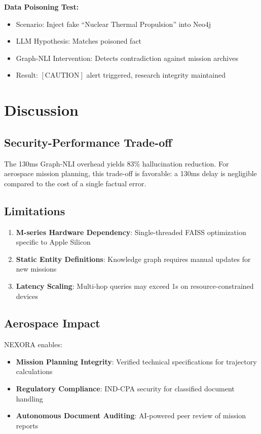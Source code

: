 \documentclass[journal,12pt,twocolumn]{IEEEtran}
\begin{document}
\textbf{Data Poisoning Test:}
\begin{itemize}
\item Scenario: Inject fake ``Nuclear Thermal Propulsion'' into Neo4j
\item LLM Hypothesis: Matches poisoned fact
\item Graph-NLI Intervention: Detects contradiction against mission archives
\item Result: $[\text{CAUTION}]$ alert triggered, research integrity maintained
\end{itemize}

\section{Discussion}

\subsection{Security-Performance Trade-off}

The 130ms Graph-NLI overhead yields 83\% hallucination reduction. For aerospace mission planning, this trade-off is favorable: a 130ms delay is negligible compared to the cost of a single factual error.

\subsection{Limitations}

\begin{enumerate}
\item \textbf{M-series Hardware Dependency}: Single-threaded FAISS optimization specific to Apple Silicon
\item \textbf{Static Entity Definitions}: Knowledge graph requires manual updates for new missions
\item \textbf{Latency Scaling}: Multi-hop queries may exceed 1s on resource-constrained devices
\end{enumerate}

\subsection{Aerospace Impact}

NEXORA enables:
\begin{itemize}
\item \textbf{Mission Planning Integrity}: Verified technical specifications for trajectory calculations
\item \textbf{Regulatory Compliance}: IND-CPA security for classified document handling
\item \textbf{Autonomous Document Auditing}: AI-powered peer review of mission reports
\end{itemize}
\end{document}
